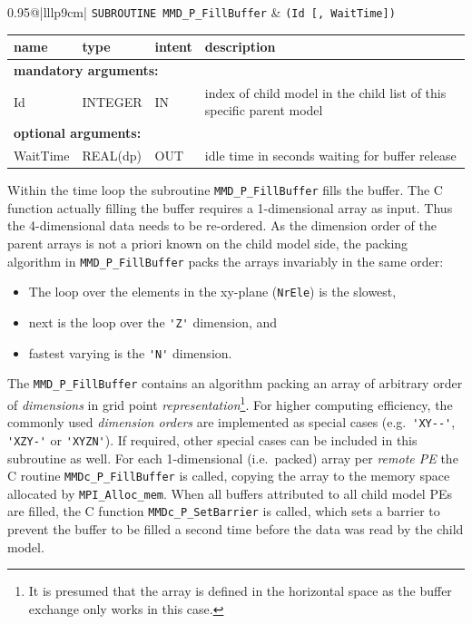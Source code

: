 \documentclass[twoside]{article}
\begin{document}
\begin{itemize}
\begin{tabular*}{0.95\textwidth}{@{\extracolsep\fill}|lllp{9cm}|}
\hline
{}
{\tt  SUBROUTINE MMD\_P\_FillBuffer} &
{\tt (Id [, WaitTime])}\\
\hline
\end{tabular*}
\begin{tabular*}{0.95\textwidth}{@{\extracolsep\fill}|lllp{9cm}|}
name & type & intent & description\\
\hline
\multicolumn{4}{|l|}{\bf mandatory arguments:}\\
Id & {\footnotesize INTEGER} & IN &  index of child model in the child list of this specific parent model\\
\multicolumn{4}{|l|}{\bf optional arguments:}\\
WaitTime & {\footnotesize REAL(dp)} & OUT & idle time in seconds waiting for buffer release\\
\hline
\end{tabular*}
\smallskip

Within the time loop the subroutine \verb|MMD_P_FillBuffer| fills the buffer.
The C function actually filling the buffer requires a 1-dimensional array as
 input.  Thus the 4-dimensional data needs to be re-ordered. As the dimension 
order of the parent arrays is not a priori known on the child model side, the
packing algorithm in \verb|MMD_P_FillBuffer| packs the arrays
 invariably in the same order:
\begin{itemize}
\item The loop over the elements in the 
xy-plane (\verb|NrEle|) is the slowest,
\item  next is the loop over the \verb|'Z'| 
dimension, and
\item fastest varying is the \verb|'N'| dimension. 
\end{itemize}
The \verb|MMD_P_FillBuffer| contains an algorithm packing an array of arbitrary 
order of {\it dimensions} in grid point {\it representation}\footnote{It is 
presumed that the array is defined in the 
horizontal space as the buffer exchange only works in this case.}.
For higher computing efficiency, the commonly used {\it dimension orders} are 
implemented as special cases (e.g.\ \verb|'XY--'|, \verb|'XZY-'|
or \verb|'XYZN'|). If required, other special cases can be included in this
subroutine as well. For each 1-dimensional (i.e.\ packed) array per {\it remote 
PE} 
the C routine \verb|MMDc_P_FillBuffer| is called, copying the array to the
memory space allocated by \verb|MPI_Alloc_mem|. 
When all buffers attributed to all child model PEs are filled, the C function
\verb|MMDc_P_SetBarrier| is called, which sets a barrier to prevent the buffer 
to be filled a second time before the data was read by the child model.


\end{itemize}
\end{document}
